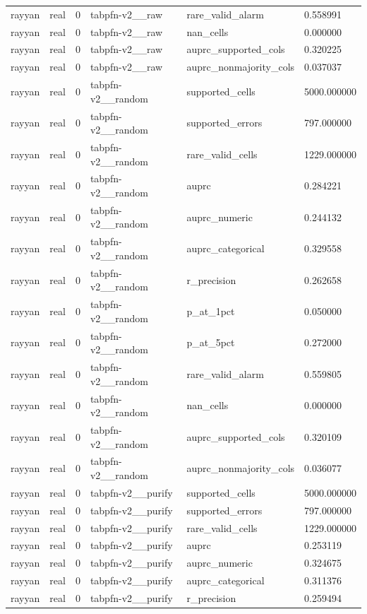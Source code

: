 \begin{tabular}{llllll}
rayyan & real & 0 & tabpfn-v2\_\_raw & rare\_valid\_alarm & 0.558991 \\
rayyan & real & 0 & tabpfn-v2\_\_raw & nan\_cells & 0.000000 \\
rayyan & real & 0 & tabpfn-v2\_\_raw & auprc\_supported\_cols & 0.320225 \\
rayyan & real & 0 & tabpfn-v2\_\_raw & auprc\_nonmajority\_cols & 0.037037 \\
rayyan & real & 0 & tabpfn-v2\_\_random & supported\_cells & 5000.000000 \\
rayyan & real & 0 & tabpfn-v2\_\_random & supported\_errors & 797.000000 \\
rayyan & real & 0 & tabpfn-v2\_\_random & rare\_valid\_cells & 1229.000000 \\
rayyan & real & 0 & tabpfn-v2\_\_random & auprc & 0.284221 \\
rayyan & real & 0 & tabpfn-v2\_\_random & auprc\_numeric & 0.244132 \\
rayyan & real & 0 & tabpfn-v2\_\_random & auprc\_categorical & 0.329558 \\
rayyan & real & 0 & tabpfn-v2\_\_random & r\_precision & 0.262658 \\
rayyan & real & 0 & tabpfn-v2\_\_random & p\_at\_1pct & 0.050000 \\
rayyan & real & 0 & tabpfn-v2\_\_random & p\_at\_5pct & 0.272000 \\
rayyan & real & 0 & tabpfn-v2\_\_random & rare\_valid\_alarm & 0.559805 \\
rayyan & real & 0 & tabpfn-v2\_\_random & nan\_cells & 0.000000 \\
rayyan & real & 0 & tabpfn-v2\_\_random & auprc\_supported\_cols & 0.320109 \\
rayyan & real & 0 & tabpfn-v2\_\_random & auprc\_nonmajority\_cols & 0.036077 \\
rayyan & real & 0 & tabpfn-v2\_\_purify & supported\_cells & 5000.000000 \\
rayyan & real & 0 & tabpfn-v2\_\_purify & supported\_errors & 797.000000 \\
rayyan & real & 0 & tabpfn-v2\_\_purify & rare\_valid\_cells & 1229.000000 \\
rayyan & real & 0 & tabpfn-v2\_\_purify & auprc & 0.253119 \\
rayyan & real & 0 & tabpfn-v2\_\_purify & auprc\_numeric & 0.324675 \\
rayyan & real & 0 & tabpfn-v2\_\_purify & auprc\_categorical & 0.311376 \\
rayyan & real & 0 & tabpfn-v2\_\_purify & r\_precision & 0.259494 \\

\end{tabular}
